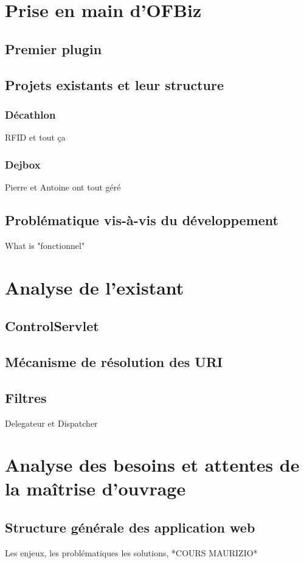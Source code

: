 \newpage
\section{Prise en main d'OFBiz}

\subsection{Premier plugin}

\subsection{Projets existants et leur structure}
\subsubsection{Décathlon}
RFID et tout ça
\subsubsection{Dejbox}
Pierre et Antoine ont tout géré 

\subsection{Problématique vis-à-vis du développement}
What is "fonctionnel"

\newpage

\section{Analyse de l'existant}
\subsection{ControlServlet}
\subsection{Mécanisme de résolution des URI}
\subsection{Filtres}
Delegateur et Dispatcher


\newpage

\section{Analyse des besoins et attentes de la maîtrise d'ouvrage}
\subsection{Structure générale des application web}
Les enjeux, les problématiques les solutions, *COURS MAURIZIO*
